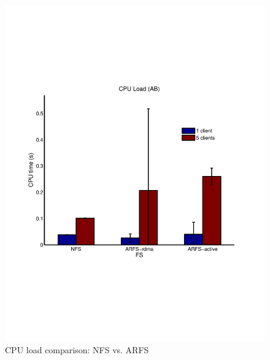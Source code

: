 \documentclass[10pt]{article}
\begin{document}
\begin{figure}
  \centering
\includegraphics[scale=0.5, trim = 0 200 0 200]{../../results/matlab/cpuload.pdf}
  \caption{CPU load comparison: NFS vs. ARFS}\label{cpuload}
\end{figure}
\end{document}
